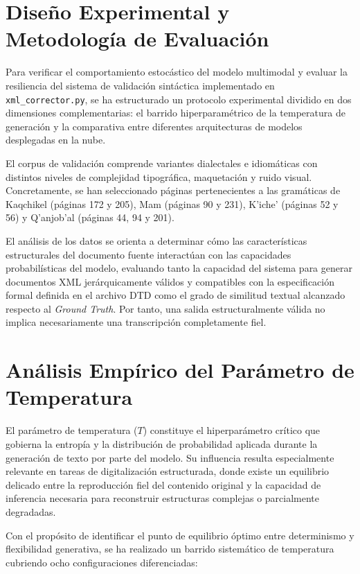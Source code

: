 \section{Diseño Experimental y Metodología de Evaluación}

Para verificar el comportamiento estocástico del modelo multimodal y evaluar la resiliencia del sistema de validación sintáctica implementado en \texttt{xml\_corrector.py}, se ha estructurado un protocolo experimental dividido en dos dimensiones complementarias: el barrido hiperparamétrico de la temperatura de generación y la comparativa entre diferentes arquitecturas de modelos desplegadas en la nube.

El corpus de validación comprende variantes dialectales e idiomáticas con distintos niveles de complejidad tipográfica, maquetación y ruido visual. Concretamente, se han seleccionado páginas pertenecientes a las gramáticas de Kaqchikel (páginas 172 y 205), Mam (páginas 90 y 231), K’iche’ (páginas 52 y 56) y Q’anjob’al (páginas 44, 94 y 201).

El análisis de los datos se orienta a determinar cómo las características estructurales del documento fuente interactúan con las capacidades probabilísticas del modelo, evaluando tanto la capacidad del sistema para generar documentos XML jerárquicamente válidos y compatibles con la especificación formal definida en el archivo DTD como el grado de similitud textual alcanzado respecto al \textit{Ground Truth}. Por tanto, una salida estructuralmente válida no implica necesariamente una transcripción completamente fiel.

\section{Análisis Empírico del Parámetro de Temperatura}

El parámetro de temperatura (\(T\)) constituye el hiperparámetro crítico que gobierna la entropía y la distribución de probabilidad aplicada durante la generación de texto por parte del modelo. Su influencia resulta especialmente relevante en tareas de digitalización estructurada, donde existe un equilibrio delicado entre la reproducción fiel del contenido original y la capacidad de inferencia necesaria para reconstruir estructuras complejas o parcialmente degradadas.

Con el propósito de identificar el punto de equilibrio óptimo entre determinismo y flexibilidad generativa, se ha realizado un barrido sistemático de temperatura cubriendo ocho configuraciones diferenciadas:

